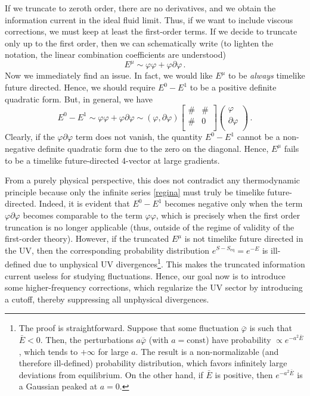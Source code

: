 \documentclass[a4paper, amsfonts, amssymb, amsmath, reprint, showkeys, nofootinbib, twoside,notitlepage,onecolumn,preprintnumbers]{revtex4-2}
\theoremstyle{definition}
\theoremstyle{theorem}
\theoremstyle{corollary}
\begin{document}
If we truncate to zeroth order, there are no derivatives, and we obtain the information current in the ideal fluid limit. Thus, if we want to include viscous corrections, we must keep at least the first-order terms. If we decide to truncate only up to the first order, then we can schematically write (to lighten the notation, the linear combination coefficients are understood) 
\begin{equation}
E^\mu \sim \varphi \varphi + \varphi \partial \varphi \, .
\end{equation}
Now we immediately find an issue. In fact, we would like $E^\mu$ to be \textit{always} timelike future directed. Hence, we should require $E^0-E^1$ to be a positive definite quadratic form. But, in general, we have
\begin{equation}
E^0-E^1 \sim \varphi \varphi + \varphi \partial \varphi  \sim (\varphi, \partial \varphi)
\begin{bmatrix}
\#  &  \# \\
\# &  0 \\
\end{bmatrix}
\begin{pmatrix}
\varphi \\
\partial \varphi \\
\end{pmatrix} \, .
\end{equation}
Clearly, if the $\varphi \partial \varphi$ term does not vanish, the quantity $E^0-E^1$ cannot be a non-negative definite quadratic form due to the zero on the diagonal. Hence, $E^\mu$ fails to be a timelike future-directed 4-vector at large gradients. 

From a purely physical perspective, this does not contradict any thermodynamic principle because only the infinite series \eqref{regina} must truly be timelike future-directed. Indeed, it is evident that $E^0-E^1$ becomes negative only when the term $\varphi \partial \varphi$ becomes comparable to the term $\varphi \varphi$, which is precisely when the first order truncation is no longer applicable (thus, outside of the regime of validity of the first-order theory). However, if the truncated $E^\mu$ is not timelike future directed in the UV, then the corresponding probability distribution $e^{S-S_{\text{eq}}}=e^{-E}$ is ill-defined due to unphysical UV divergences\footnote{\label{This_orsiu}The proof is straightforward. Suppose that some fluctuation $\bar{\varphi}$ is such that $\bar{E}<0$. Then, the perturbations $a\bar{\varphi}$ (with $a =\text{const}$) have probability $\propto e^{-a^2\bar{E}}$, which tends to $+\infty$ for large $a$. The result is a non-normalizable (and therefore ill-defined) probability distribution, which favors infinitely large deviations from equilibrium. On the other hand, if $\bar{E}$ is positive, then $e^{-a^2\bar{E}}$ is a Gaussian peaked at $a=0$.}. This makes the truncated information current useless for studying fluctuations. Hence, our goal now is to introduce some higher-frequency corrections, which regularize the UV sector by introducing a cutoff, thereby suppressing all unphysical divergences. 
\end{document}
